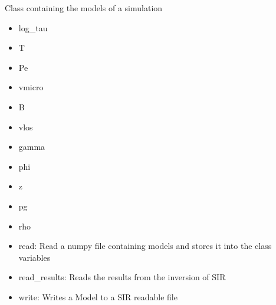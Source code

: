 \documentclass[letterpaper,10pt,english]{sphinxmanual}
\begin{document}
\begin{fulllineitems}
\label{\detokenize{classes:model.Model}}
\pysigstartsignatures
{}
\pysigstopsignatures
\sphinxAtStartPar
Class containing the models of a simulation
\begin{description}
\begin{itemize}
\item {} 
\sphinxAtStartPar
log\_tau

\item {} 
\sphinxAtStartPar
T

\item {} 
\sphinxAtStartPar
Pe

\item {} 
\sphinxAtStartPar
vmicro

\item {} 
\sphinxAtStartPar
B

\item {} 
\sphinxAtStartPar
vlos

\item {} 
\sphinxAtStartPar
gamma

\item {} 
\sphinxAtStartPar
phi

\item {} 
\sphinxAtStartPar
z

\item {} 
\sphinxAtStartPar
pg

\item {} 
\sphinxAtStartPar
rho

\end{itemize}

\begin{itemize}
\item {} 
\sphinxAtStartPar
read: Read a numpy file containing models and stores it into the class variables

\item {} 
\sphinxAtStartPar
read\_results: Reads the results from the inversion of SIR

\item {} 
\sphinxAtStartPar
write: Writes a Model to a SIR readable file


\end{itemize}
\end{description}
\end{fulllineitems}
\end{document}
